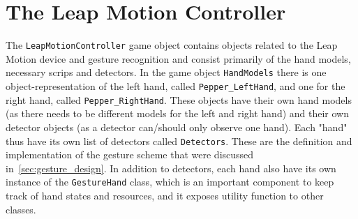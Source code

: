 \section{The Leap Motion Controller}
The \texttt{LeapMotionController} game object contains objects related to the Leap Motion device and gesture recognition and consist primarily of the hand models, necessary 
scrips and detectors. In the game object \texttt{HandModels} there is one object-representation of the left hand, called \texttt{Pepper\_LeftHand}, and one for the 
right hand, called \texttt{Pepper\_RightHand}. These objects have their own hand models (as there needs to be different models for the left and right hand) and their 
own detector objects (as a detector can/should only observe one hand). Each "hand" thus have its own list of detectors called \texttt{Detectors}. 
These are the definition and implementation of the gesture scheme that were discussed in~\vref{sec:gesture_design}. In addition to detectors, each
hand also have its own instance of the \texttt{GestureHand} class, which is an important component to keep track of hand states and resources, and
it exposes utility function to other classes. 

